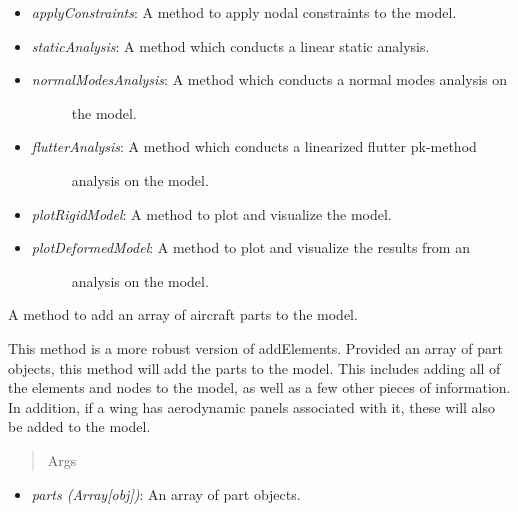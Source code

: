 \documentclass[letterpaper,10pt,english]{sphinxmanual}
\begin{document}
\begin{fulllineitems}
\begin{itemize}
\item {} 
\emph{applyConstraints}: A method to apply nodal constraints to the model.

\item {} 
\emph{staticAnalysis}: A method which conducts a linear static analysis.

\item {} \begin{description}
\item[{\emph{normalModesAnalysis}: A method which conducts a normal modes analysis on}] \leavevmode
the model.

\end{description}

\item {} \begin{description}
\item[{\emph{flutterAnalysis}: A method which conducts a linearized flutter pk-method}] \leavevmode
analysis on the model.

\end{description}

\item {} 
\emph{plotRigidModel}: A method to plot and visualize the model.

\item {} \begin{description}
\item[{\emph{plotDeformedModel}: A method to plot and visualize the results from an}] \leavevmode
analysis on the model.

\end{description}

\end{itemize}

\begin{fulllineitems}
\label{FEM:AeroComBAT.FEM.Model.addAircraftParts}
A method to add an array of aircraft parts to the model.

This method is a more robust version of addElements. Provided an array
of part objects, this method will add the parts to the model. This
includes adding all of the elements and nodes to the model, as well as
a few other pieces of information. In addition, if a wing has
aerodynamic panels associated with it, these will also be added to the
model.
\begin{quote}\begin{description}
\item[{Args}] \leavevmode
\end{description}\end{quote}
\begin{itemize}
\item {} 
\emph{parts (Array{[}obj{]})}: An array of part objects.


\end{itemize}
\end{fulllineitems}
\end{fulllineitems}
\end{document}
